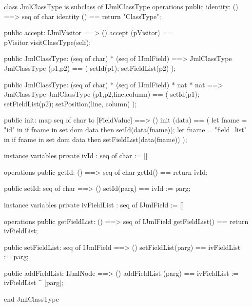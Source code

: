 \begin{vdm_al}
class JmlClassType is subclass of IJmlClassType
operations
  public identity: () ==> seq of char
  identity () == return "ClassType";

  public accept: IJmlVisitor ==> ()
  accept (pVisitor) == pVisitor.visitClassType(self);

  public JmlClassType:
    (seq of char) *
    (seq of IJmlField) ==> JmlClassType
  JmlClassType (p1,p2) == 
    ( setId(p1);
      setFieldList(p2) );

  public JmlClassType:
    (seq of char) *
    (seq of IJmlField) *
    nat *
    nat ==> JmlClassType
  JmlClassType (p1,p2,line,column) == 
    ( setId(p1);
      setFieldList(p2);
      setPosition(line, column) );

  public init: map seq of char to [FieldValue] ==> ()
  init (data) ==
    ( let fname = "id" in
        if fname in set dom data
        then setId(data(fname));
      let fname = "field_list" in
        if fname in set dom data
        then setFieldList(data(fname)) );

instance variables
  private ivId : seq of char := []

operations
  public getId: () ==> seq of char
  getId() == return ivId;

  public setId: seq of char ==> ()
  setId(parg) == ivId := parg;

instance variables
  private ivFieldList : seq of IJmlField := []

operations
  public getFieldList: () ==> seq of IJmlField
  getFieldList() == return ivFieldList;

  public setFieldList: seq of IJmlField ==> ()
  setFieldList(parg) == ivFieldList := parg;

  public addFieldList: IJmlNode ==> ()
  addFieldList (parg) == ivFieldList := ivFieldList ^ [parg];

end JmlClassType
\end{vdm_al}

